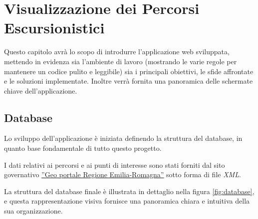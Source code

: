 \clearpage{\pagestyle{empty}\cleardoublepage}
\chapter{Visualizzazione dei Percorsi Escursionistici}


Questo capitolo avrà lo scopo di introdurre l'applicazione web sviluppata, mettendo in evidenza sia l'ambiente di lavoro (mostrando le varie regole per mantenere un codice pulito e leggibile) sia i principali obiettivi, le sfide affrontate e le soluzioni implementate. Inoltre verrà fornita una panoramica delle schermate chiave dell'applicazione.

\section{Database}

 Lo sviluppo dell'applicazione è iniziata definendo la struttura del database, in quanto base fondamentale di tutto questo progetto.

I dati relativi ai percorsi e ai punti di interesse sono stati forniti dal sito governativo \href{https://geoportale.regione.emilia-romagna.it/catalogo/dati-cartografici/ambiente/percorsi-escursionistici}{”Geo portale Regione Emilia-Romagna”} sotto forma di file \emph{XML}.

La struttura del database finale è illustrata in dettaglio nella figura \ref{fig:database}, e questa rappresentazione visiva fornisce una panoramica chiara e intuitiva della sua organizzazione.

